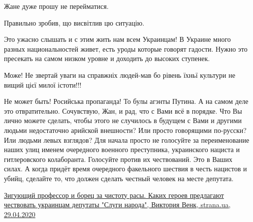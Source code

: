 \begin{itemize}
Жане дуже прошу не перейматися.

Правильно зробив, що висвітлив цю ситуацію.


 

Это ужасно слышать и с этим жить нам всем Украинцам! В Украине много разных
национальностей живет, есть уроды которые говорят гадости. Нужно это пресекать
на самом низком уровне и доходить до высоких ступенек.


 

Може! Не звертай уваги на справжніх людей-мав бо рівень їхньї культури не вищий
цієї милої істоти!!!

 

Не может быть! Росийська пропаганда! То булы агэнты Путина. А на самом деле это
отвратительно. Сочувствую, Жан, и рад, что с Вами всё в порядке. Что Вы лично
можете сделать, чтобы этого не случилось в будущем с Вами и другими людьми
недостаточно арийской внешности? Или просто говорящими по-русски? Или людьми
левых взглядов? Для начала просто не голосуйте за переименование наших улиц
именем очередного военного преступника, украинского нациста и гитлеровского
колаборанта. Голосуйте против их чествований. Это в Ваших силах. А когда придёт
время очередного факельного шествия в честь нацистов и убийц, сделайте то, что
должен сделать честный человек на месте депутата.

\href{https://strana.ua/news/264084-natsistskie-druzja-iz-oun-i-upa-kakikh-heroev-predlahajut-ukraintsam-deputaty-sluhi-naroda.html}{%
Зигующий профессор и борец за чистоту расы. Каких героев предлагают чествовать украинцам депутаты "Слуги народа", %
Виктория Венк, %
strana.ua, 29.04.2020%
}

 


\end{itemize}

